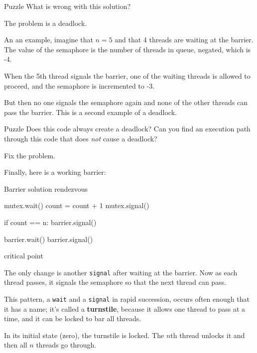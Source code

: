 \begin{puzzlebox}{Puzzle}
What is wrong with this solution?
\end{puzzlebox}


The problem is a deadlock.

An an example, imagine that $n=5$
and that 4 threads are waiting at the barrier.  The value
of the semaphore is the number of threads in queue, negated, 
which is -4.

When the 5th thread signals the barrier, one of the waiting
threads is allowed to proceed, and the semaphore is incremented
to -3.

But then no one signals the semaphore again and none of the
other threads can pass the barrier.
This is a second example of a deadlock.


\begin{puzzlebox}{Puzzle}
Does this code always create a deadlock?  Can you find an
execution path through this code that does {\em not} cause a deadlock?

\vspace{1em}
Fix the problem.
\end{puzzlebox}


\label{barrier}

Finally, here is a working barrier:

\begin{lstbox}{Barrier solution}
rendezvous

mutex.wait()
    count = count + 1
mutex.signal()

if count == n: barrier.signal()

barrier.wait()
barrier.signal()

critical point
\end{lstbox}

The only change is another {\tt signal} after waiting
at the barrier.  Now as each thread passes, it signals the
semaphore so that the next thread can pass.

This pattern, a {\tt wait} and a {\tt signal} in rapid
succession, occurs often enough that it has a name;
it's called a {\bf turnstile}, because it allows one thread to pass
at a time, and it can be locked to bar all threads.

In its initial state (zero), the turnstile is locked.  The $n$th
thread unlocks it and then all $n$ threads go through.

